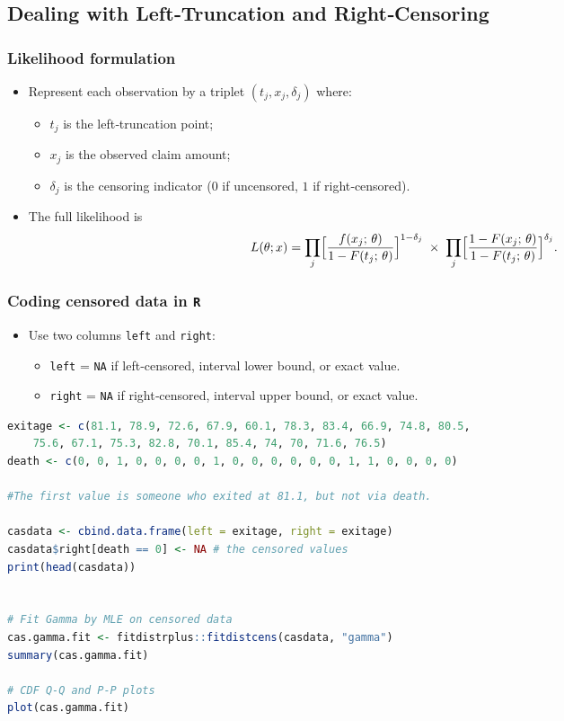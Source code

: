 \documentclass{article}
\begin{document}
\subsection{Dealing with Left‐Truncation and Right‐Censoring}

\subsubsection{Likelihood formulation}
\begin{itemize}
  \item Represent each observation by a triplet $(t_j, x_j, \delta_j)$ where:
    \begin{itemize}
      \item $t_j$ is the left‐truncation point;
      \item $x_j$ is the observed claim amount;
      \item $\delta_j$ is the censoring indicator ($0$ if uncensored, $1$ if right‐censored).
    \end{itemize}
  \item The full likelihood is
    \begin{equation*}
      L(\theta; x)
      = \prod_j
        \Bigl[\frac{f(x_j;\,\theta)}{1 - F(t_j;\,\theta)}\Bigr]^{1 - \delta_j}
      \;\times\;
      \prod_j
        \Bigl[\frac{1 - F(x_j;\,\theta)}{1 - F(t_j;\,\theta)}\Bigr]^{\delta_j}.
    \end{equation*}
\end{itemize}

\subsubsection{Coding censored data in \texttt{R}}
\begin{itemize}
  \item Use two columns \texttt{left} and \texttt{right}:
    \begin{itemize}
      \item \texttt{left} = \texttt{NA} if left‐censored, interval lower bound, or exact value.
      \item \texttt{right} = \texttt{NA} if right‐censored, interval upper bound, or exact value.
    \end{itemize}
\end{itemize}
\begin{lstlisting}[language=R]
exitage <- c(81.1, 78.9, 72.6, 67.9, 60.1, 78.3, 83.4, 66.9, 74.8, 80.5,    
    75.6, 67.1, 75.3, 82.8, 70.1, 85.4, 74, 70, 71.6, 76.5)
death <- c(0, 0, 1, 0, 0, 0, 0, 1, 0, 0, 0, 0, 0, 0, 1, 1, 0, 0, 0, 0)

#The first value is someone who exited at 81.1, but not via death.

casdata <- cbind.data.frame(left = exitage, right = exitage)
casdata$right[death == 0] <- NA # the censored values
print(head(casdata))


# Fit Gamma by MLE on censored data
cas.gamma.fit <- fitdistrplus::fitdistcens(casdata, "gamma")
summary(cas.gamma.fit)

# CDF Q-Q and P-P plots
plot(cas.gamma.fit)
\end{lstlisting}
\end{document}
